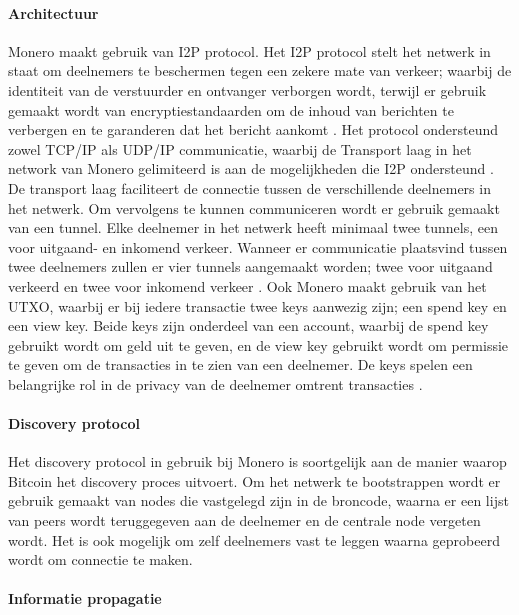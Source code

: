 \paragraph{Architectuur}

Monero maakt gebruik van \acrfull{I2P} protocol. Het \acrshort{I2P} protocol stelt het netwerk in staat om deelnemers te beschermen tegen een zekere mate van verkeer; waarbij de identiteit van de verstuurder en ontvanger verborgen wordt, terwijl er gebruik gemaakt wordt van encryptiestandaarden om de inhoud van berichten te verbergen en te garanderen dat het bericht aankomt \citep{zantout2011i2p}. Het protocol ondersteund zowel TCP/IP als UDP/IP communicatie, waarbij de Transport laag in het network van Monero gelimiteerd is aan de mogelijkheden die \acrshort{I2P} ondersteund \citep{moneropedia:kovri}.
De transport laag faciliteert de connectie tussen de verschillende deelnemers in het netwerk. Om vervolgens te kunnen communiceren wordt er gebruik gemaakt van een \gls{tunnel}. Elke deelnemer in het netwerk heeft minimaal twee \Glspl{tunnel}, een voor uitgaand- en inkomend verkeer. Wanneer er communicatie plaatsvind tussen twee deelnemers zullen er vier \glspl{tunnel} aangemaakt worden; twee voor uitgaand verkeerd en twee voor inkomend verkeer \citep{moneropedia:tunnel}. Ook Monero maakt gebruik van het \gls{UTXO}, waarbij er bij iedere transactie twee keys aanwezig zijn; een spend key en een view key. Beide keys zijn onderdeel van een account, waarbij de spend key gebruikt wordt om geld uit te geven, en de view key gebruikt wordt om permissie te geven om de transacties in te zien van een deelnemer. De keys spelen een belangrijke rol in de privacy van de deelnemer omtrent transacties \citep{moneropedia:account}. 

\paragraph{Discovery protocol}

Het discovery protocol in gebruik bij Monero is soortgelijk aan de manier waarop Bitcoin het discovery proces uitvoert. Om het netwerk te bootstrappen wordt er gebruik gemaakt van \glspl{node} die vastgelegd zijn in de broncode, waarna er een lijst van \glspl{peer} wordt teruggegeven aan de deelnemer en de centrale node vergeten wordt. Het is ook mogelijk om zelf deelnemers vast te leggen waarna geprobeerd wordt om connectie te maken.

\paragraph{Informatie propagatie}


